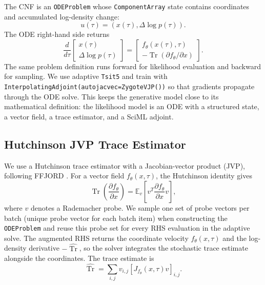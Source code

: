 \documentclass[reprint,amsmath,amssymb,aps,pra,10pt]{revtex4-2}
\begin{document}
The CNF is an \texttt{ODEProblem} whose \texttt{ComponentArray} state contains coordinates and accumulated log-density change:
\begin{equation}
    u(\tau)
    =
    \left(
        x(\tau),
        \Delta \log p(\tau)
    \right).
\end{equation}
The ODE right-hand side returns
\begin{equation}
    \frac{d}{d\tau}
    \begin{bmatrix}
        x(\tau) \\
        \Delta \log p(\tau)
    \end{bmatrix}
    =
    \begin{bmatrix}
        f_\theta(x(\tau),\tau) \\
        -\operatorname{Tr}
        \left(
            \partial f_\theta/\partial x
        \right)
    \end{bmatrix}.
\end{equation}
The same problem definition runs forward for likelihood evaluation and backward for sampling.
We use adaptive \texttt{Tsit5} and train with \texttt{InterpolatingAdjoint(autojacvec=ZygoteVJP())} so that gradients propagate through the ODE solve.
This keeps the generative model close to its mathematical definition: the likelihood model is an ODE with a structured state, a vector field, a trace estimator, and a SciML adjoint.

\subsection*{Hutchinson JVP Trace Estimator}

We use a Hutchinson trace estimator with a Jacobian-vector product (JVP), following FFJORD \cite{grathwohl2018}.
For a vector field $f_\theta(x,\tau)$, the Hutchinson identity gives
\begin{equation}
    \operatorname{Tr}
    \left(
        \frac{\partial f_\theta}{\partial x}
    \right)
    =
    \mathbb{E}_{v}
    \left[
        v^T
        \frac{\partial f_\theta}{\partial x}
        v
    \right],
\end{equation}
where $v$ denotes a Rademacher probe.
We sample one set of probe vectors per batch (unique probe vector for each batch item) when constructing the \texttt{ODEProblem} and reuse this probe set for every RHS evaluation in the adaptive solve.
The augmented RHS returns the coordinate velocity $f_\theta(x,\tau)$ and the log-density derivative $-\widehat{\operatorname{Tr}}$, so the solver integrates the stochastic trace estimate alongside the coordinates.
The trace estimate is
\begin{equation}
    \widehat{\operatorname{Tr}}
    =
    \sum_{i,j}
    v_{i,j}
    \left[
        J_{f_\theta}(x,\tau)v
    \right]_{i,j}.
\end{equation}
\end{document}
